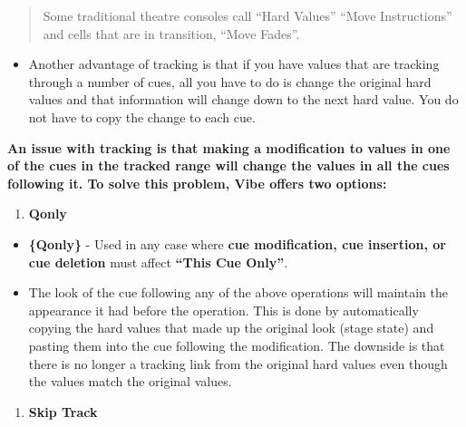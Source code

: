 \documentclass[
]{article}
\providecommand{\tightlist}{%
  \setlength{\itemsep}{0pt}\setlength{\parskip}{0pt}}
\begin{document}
\begin{quote}
Some traditional theatre consoles call ``Hard Values'' ``Move Instructions'' and cells that are in transition, ``Move Fades''.
\end{quote}

\begin{itemize}
\tightlist
\item
  Another advantage of tracking is that if you have values that are tracking through a number of cues, all you have to do is change the original hard values and that information will change down to the next hard value. You do not have to copy the change to each cue.
\end{itemize}

\textbf{An issue with tracking is that making a modification to values in one of the cues in the tracked range will change the values in all the cues following it. To solve this problem, Vibe offers two options:}

\begin{enumerate}
\def\labelenumi{\arabic{enumi}.}
\tightlist
\item
  \textbf{Qonly}
\end{enumerate}

\begin{itemize}
\item
  \textbf{\{Qonly\}} - Used in any case where \textbf{cue modification, cue insertion, or cue deletion} must affect \textbf{``This Cue Only''}.
\item
  The look of the cue following any of the above operations will maintain the appearance it had before the operation. This is done by automatically copying the hard values that made up the original look (stage state) and pasting them into the cue following the modification. The downside is that there is no longer a tracking link from the original hard values even though the values match the original values.
\end{itemize}

\begin{enumerate}
\def\labelenumi{\arabic{enumi}.}
\setcounter{enumi}{1}
\tightlist
\item
  \textbf{Skip Track}
\end{enumerate}
\end{document}
